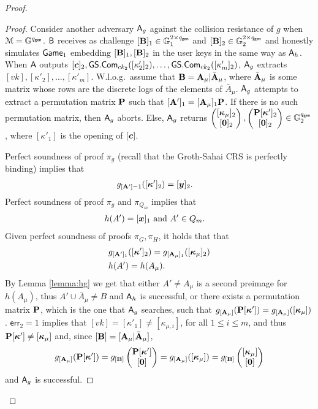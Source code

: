 \begin{proof}
\begin{proof}
Consider another adversary $\mathsf{A}_g$ against the collision resistance of $g$ when $\mathcal{M}=\mathbb{G}^{q_\mathsf{gen}}$. $\mathsf{B}$ receives as challenge $[\mathbf{{B}}]_1\in\mathbb{G}^{2\times {q_\mathsf{gen}}}_1$ and $[\mathbf{{B}}]_2\in\mathbb{G}^{2\times {q_\mathsf{gen}}}_2$ and honestly simulates $\mathsf{Game}_1$ embedding $[\mathbf{{B}}]_1,[\mathbf{{B}}]_2$ in the user keys in the same way as $\mathsf{A}_h$. When $\mathsf{A}$ outputs $[{\boldsymbol{c}}]_2,\allowbreak{\mathsf{GS}}.\mathsf{Com}_{ck_2}([\kappa'_2]_2),\ldots,\allowbreak{\mathsf{GS}}.\mathsf{Com}_{ck_2}([\kappa'_m]_2)$, $\mathsf{A}_g$ extracts $[vk],[\kappa'_2],\ldots,[\kappa'_m]$. W.l.o.g.~\allowbreak assume that $\mathbf{{B}}=\mathbf{{A}}_\mu|\bar{\mathbf{{A}}}_\mu$, where $\bar{\mathbf{{A}}}_\mu$ is some matrix whose rows are the discrete logs of the elements of $\bar{A}_\mu$. $\mathsf{A}_g$ attempts to extract a permutation matrix $\mathbf{{P}}$ such that  $[\mathbf{{A}}']_1=[\mathbf{{A}}_\mu]_1\mathbf{{P}}$. If there is no such permutation matrix, then $\mathsf{A}_g$ aborts. Else,  $\mathsf{A}_g$ returns
$\left(\begin{matrix}
	{[{\boldsymbol{\kappa}}_\mu]_2}\\
	{[{\boldsymbol{0}}]_2}\end{matrix}\right),
\left(\begin{matrix}
	{\mathbf{{P}}[{\boldsymbol{\kappa}}']_2}\\
	{[{\boldsymbol{0}}]_2}\end{matrix}\right)
\in\mathbb{G}^{q_\mathsf{gen}}_2$,
where $[\kappa'_1]$ is the opening of $[{\boldsymbol{c}}]$.

Perfect soundness of proof $\pi_g$  (recall that the Groth-Sahai CRS is perfectly binding)  implies that
\begin{align*}
&g_{[\matr{A}']-1}([\vecb{\kappa}']_2)=[\vecb{y}]_2. %
\end{align*}
Perfect soundness of proof $\pi_g$ and $\pi_{Q_m}$ implies that
\begin{align*}
&h(A')=[\vecb{x}]_1\text{ and } A'\in Q_m.%
\end{align*}
Given perfect soundness of proofs $\pi_G,\pi_H$, it holds that that
\begin{align*}
&g_{[\matr{A}']_1}([\vecb{\kappa}']_2)=g_{[\matr{A}_\mu]_1}([\vecb{\kappa}_\mu]_2)%
\\
&h(A')=h(A_\mu). %
\end{align*}
By Lemma \ref{lemma:hg} we get that either $A'\neq {A}_\mu$ is a second preimage for $h(A_\mu)$, thus $A'\cup\bar{A}_\mu\neq B$ and $\mathsf{A}_h$ is successful, or there exists a permutation matrix $\mathbf{{P}}$, which is the one that $\mathsf{A}_g$ searches, such that $g_{[\mathbf{{A}}_\mu]}(\mathbf{{P}}[{\boldsymbol{\kappa}}'])=g_{[\mathbf{{A}}_\mu]}([{\boldsymbol{\kappa}}_\mu])$. $\mathsf{err}_2=1$ implies that $[vk]=[\kappa'_1]\neq[\kappa_{\mu,i}]$, for all $1\leq i\leq m$, and thus $\mathbf{{P}}[{\boldsymbol{\kappa}}']\neq [{\boldsymbol{\kappa}}_\mu]$ and, since $[\mathbf{{B}}]=[\mathbf{{A}}_\mu|\bar{\mathbf{{A}}}_\mu]$,
$$
g_{[\mathbf{{A}}_\mu]}(\mathbf{{P}}[{\boldsymbol{\kappa}}'])=
g_{[\mathbf{{B}}]}\left(\begin{matrix}
	{\mathbf{{P}}[{\boldsymbol{\kappa}}']}\\
	{[{\boldsymbol{0}}]}\end{matrix}\right)
=
g_{[\mathbf{{A}}_\mu]}([{\boldsymbol{\kappa}}_\mu])
=
g_{[\mathbf{{B}}]}\left(\begin{matrix}
	{[{\boldsymbol{\kappa}}_\mu]}\\
	{[{\boldsymbol{0}}]}\end{matrix}\right)
$$ 
and $\mathsf{A}_g$ is successful.


\end{proof}
\end{proof}
